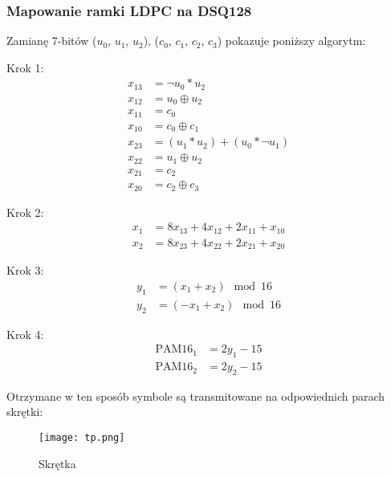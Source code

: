 \subsubsection{Mapowanie ramki LDPC na DSQ128}\label{mapowanie}
Zamianę 7-bitów ($u_0$, $u_1$, $u_2$), ($c_0$, $c_1$, $c_2$, $c_3$) pokazuje poniższy algorytm:

Krok 1:
\begin{align*}
    x_{13} &= \neg u_0 * u_2 \\
    x_{12} &= u_0 \oplus u_2 \\
    x_{11} &= c_0 \\
    x_{10} &= c_0 \oplus c_1 \\
    x_{23} &= (u_1 * u_2) + (u_0 * \neg u_1) \\
    x_{22} &= u_1 \oplus u_2 \\
    x_{21} &= c_2 \\
    x_{20} &= c_2 \oplus c_3
\end{align*}

Krok 2:
\begin{align*}
    x_1 &= 8x_{13} + 4x_{12} + 2x_{11} + x_{10} \\
    x_2 &= 8x_{23} + 4x_{22} + 2x_{21} + x_{20}
\end{align*}

Krok 3:
\begin{align*}
    y_1 &= (x_1 + x_2) \mod 16 \\
    y_2 &= (-x_1 + x_2) \mod 16
\end{align*}

Krok 4:
\begin{align*}
    \text{PAM16}_1 &= 2y_1 - 15 \\
    \text{PAM16}_2 &= 2y_2 - 15
\end{align*}

Otrzymane w ten sposób symbole są transmitowane na odpowiednich parach skrętki:

\begin{table}[h]
    \centering
\end{table}

\begin{figure}[ht]
    \centering
    \texttt{[image: tp.png]}
    \caption{Skrętka}
    \label{fig:skretka-zdj}
\end{figure}
